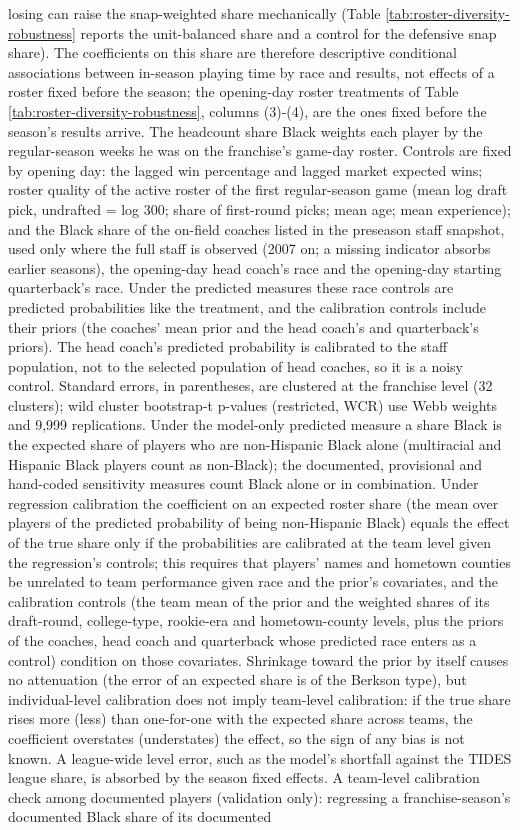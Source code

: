 {losing can raise the snap-weighted share mechanically (Table \ref{tab:roster-diversity-robustness} reports the unit-balanced share and a control for the defensive snap share). The coefficients on this share are therefore descriptive conditional associations between in-season playing time by race and results, not effects of a roster fixed before the season; the opening-day roster treatments of Table \ref{tab:roster-diversity-robustness}, columns (3)-(4), are the ones fixed before the season's results arrive. The headcount share Black weights each player by the regular-season weeks he was on the franchise's game-day roster. Controls are fixed by opening day: the lagged win percentage and lagged market expected wins; roster quality of the active roster of the first regular-season game (mean log draft pick, undrafted = log 300; share of first-round picks; mean age; mean experience); and the Black share of the on-field coaches listed in the preseason staff snapshot, used only where the full staff is observed (2007 on; a missing indicator absorbs earlier seasons), the opening-day head coach's race and the opening-day starting quarterback's race. Under the predicted measures these race controls are predicted probabilities like the treatment, and the calibration controls include their priors (the coaches' mean prior and the head coach's and quarterback's priors). The head coach's predicted probability is calibrated to the staff population, not to the selected population of head coaches, so it is a noisy control. Standard errors, in parentheses, are clustered at the franchise level (32 clusters); wild cluster bootstrap-t p-values (restricted, WCR) use Webb weights and 9,999 replications. Under the model-only predicted measure a share Black is the expected share of players who are non-Hispanic Black alone (multiracial and Hispanic Black players count as non-Black); the documented, provisional and hand-coded sensitivity measures count Black alone or in combination. Under regression calibration the coefficient on an expected roster share (the mean over players of the predicted probability of being non-Hispanic Black) equals the effect of the true share only if the probabilities are calibrated at the team level given the regression's controls; this requires that players' names and hometown counties be unrelated to team performance given race and the prior's covariates, and the calibration controls (the team mean of the prior and the weighted shares of its draft-round, college-type, rookie-era and hometown-county levels, plus the priors of the coaches, head coach and quarterback whose predicted race enters as a control) condition on those covariates. Shrinkage toward the prior by itself causes no attenuation (the error of an expected share is of the Berkson type), but individual-level calibration does not imply team-level calibration: if the true share rises more (less) than one-for-one with the expected share across teams, the coefficient overstates (understates) the effect, so the sign of any bias is not known. A league-wide level error, such as the model's shortfall against the TIDES league share, is absorbed by the season fixed effects. A team-level calibration check among documented players (validation only): regressing a franchise-season's documented Black share of its documented }
